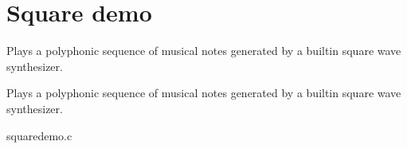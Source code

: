 \section{Square demo}
\label{group__squaredemo}


Plays a polyphonic sequence of musical notes generated by a builtin square wave synthesizer.  


Plays a polyphonic sequence of musical notes generated by a builtin square wave synthesizer. 
\begin{DoxyCodeInclude}
\end{DoxyCodeInclude}
 squaredemo.c 